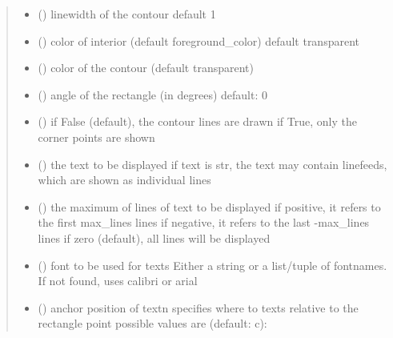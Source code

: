 \documentclass[letterpaper,10pt,english]{sphinxmanual}
\begin{document}
\begin{fulllineitems}
\begin{quote}
\begin{description}
\begin{itemize}
\item {} 
 () \textendash{} linewidth of the contour 
default 1

\item {} 
 () \textendash{} color of interior (default foreground\_color) 
default transparent

\item {} 
 () \textendash{} color of the contour (default transparent)

\item {} 
 () \textendash{} angle of the rectangle (in degrees) 
default: 0

\item {} 
 () \textendash{} if False (default), the contour lines are drawn 
if True, only the corner points are shown

\item {} 
 (\sphinxstyleliteralemphasis{, }) \textendash{} the text to be displayed 
if text is str, the text may contain linefeeds, which are shown as individual lines

\item {} 
 () \textendash{} the maximum of lines of text to be displayed 
if positive, it refers to the first max\_lines lines 
if negative, it refers to the last -max\_lines lines 
if zero (default), all lines will be displayed

\item {} 
 () \textendash{} font to be used for texts 
Either a string or a list/tuple of fontnames.
If not found, uses calibri or arial

\item {} 
 () \textendash{} anchor position of text\textbar{}n\textbar{}
specifies where to texts relative to the rectangle
point 
possible values are (default: c): 


\end{itemize}
\end{description}
\end{quote}
\end{fulllineitems}
\end{document}
